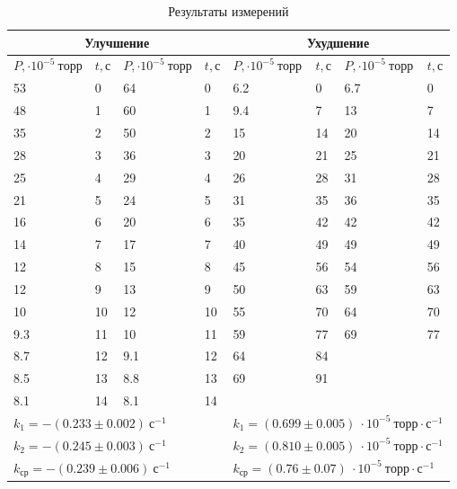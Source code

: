 \documentclass[a4paper,12pt]{article}
\begin{document}
\begin{table}[h!]
	\centering 
	\caption{Результаты измерений}
	\begin{tabular}{|l|l|l|l|l|l|l|l|} \hline 
		\multicolumn{4}{|c|}{Улучшение} & \multicolumn{4}{|c|}{Ухудшение} \\ \hline
		$P, \cdot 10^{-5}~ торр$ & $t, с$ &$P, \cdot 10^{-5}~ торр$ & $t, с$ &$P, \cdot 10^{-5}~ торр$ & $t, с$ &$P, \cdot 10^{-5}~ торр$ & $t, с$  \\ \hline
		53 & 0 & 64 & 0 &6.2 & 0 & 6.7  & 0 \\ \hline 
		48 & 1 & 60 & 1 & 9.4 & 7 & 13 & 7 \\ \hline 
		35 & 2 & 50 & 2 & 15 & 14 & 20 & 14 \\ \hline 
		28 & 3 & 36 & 3 & 20 & 21 & 25 & 21 \\ \hline 
		25 & 4 & 29 & 4 & 26 & 28 & 31 & 28 \\ \hline 
		21 & 5 & 24 & 5 & 31 & 35 & 36 & 35 \\ \hline
		16 & 6 & 20 & 6 & 35 & 42 & 42& 42 \\ \hline 
		14 & 7 & 17 & 7 & 40 & 49 & 49 & 49 \\ \hline
		12 & 8 & 15 & 8 & 45 & 56 & 54 & 56 \\ \hline 
		12 & 9 & 13 & 9 & 50 & 63 & 59 & 63 \\ \hline
		10 & 10 & 12 & 10 & 55 & 70 & 64 & 70 \\ \hline 
		9.3 & 11 & 10 & 11 & 59 & 77 & 69 & 77 \\ \hline
		8.7 & 12 & 9.1 & 12 & 64 & 84 &      &       \\ \hline
		8.5 & 13 & 8.8 & 13 & 69 & 91 &      &       \\ \hline 
		8.1 & 14 & 8.1 & 14 &         &      &       &       \\ \hline 
		\multicolumn{4}{|l|}{$k_1 = -(0.233 \pm 0.002) ~  с^{-1}$} & \multicolumn{4}{|l|}{$k_1 = (0.699\pm 0.005) ~ \cdot 10^{-5} ~торр \cdot с^{-1}$} \\ 
		
		\multicolumn{4}{|l|}{$k_2 = -(0.245 \pm 0.003) ~ с^{-1}$}
		&\multicolumn{4}{|l|}{$k_2 = (0.810 \pm 0.005) ~ \cdot 10^{-5} ~торр \cdot с^{-1}$} \\ 
		
		
		\multicolumn{4}{|l|}{$k_{ср} = -(0.239 \pm 0.006) ~ с^{-1}$}
		&\multicolumn{4}{|l|}{$k_{ср} = (0.76 \pm 0.07) ~ \cdot 10^{-5} ~ торр \cdot с^{-1}$} \\ 
		\hline
		
		
		
	\end{tabular}
\end{table}
\end{document}
